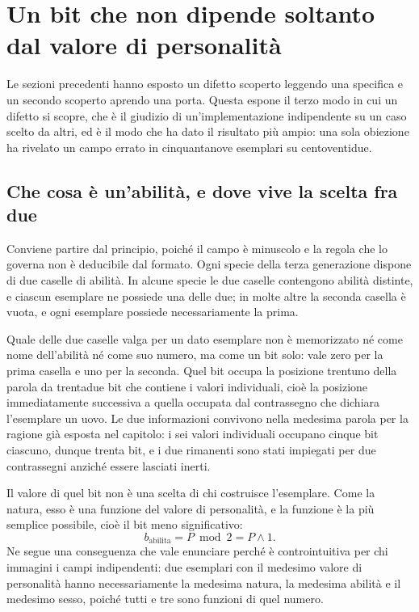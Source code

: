 \section{Un bit che non dipende soltanto dal valore di personalità}

Le sezioni precedenti hanno esposto un difetto scoperto leggendo una specifica e un secondo scoperto aprendo una porta. Questa espone il terzo modo in cui un difetto si scopre, che è il giudizio di un'implementazione indipendente su un caso scelto da altri, ed è il modo che ha dato il risultato più ampio: una sola obiezione ha rivelato un campo errato in cinquantanove esemplari su centoventidue.

\subsection*{Che cosa è un'abilità, e dove vive la scelta fra due}

Conviene partire dal principio, poiché il campo è minuscolo e la regola che lo governa non è deducibile dal formato. Ogni specie della terza generazione dispone di due caselle di abilità. In alcune specie le due caselle contengono abilità distinte, e ciascun esemplare ne possiede una delle due; in molte altre la seconda casella è vuota, e ogni esemplare possiede necessariamente la prima.

Quale delle due caselle valga per un dato esemplare non è memorizzato né come nome dell'abilità né come suo numero, ma come un bit solo: vale zero per la prima casella e uno per la seconda. Quel bit occupa la posizione trentuno della parola da trentadue bit che contiene i valori individuali, cioè la posizione immediatamente successiva a quella occupata dal contrassegno che dichiara l'esemplare un uovo. Le due informazioni convivono nella medesima parola per la ragione già esposta nel capitolo: i sei valori individuali occupano cinque bit ciascuno, dunque trenta bit, e i due rimanenti sono stati impiegati per due contrassegni anziché essere lasciati inerti.

Il valore di quel bit non è una scelta di chi costruisce l'esemplare. Come la natura, esso è una funzione del valore di personalità, e la funzione è la più semplice possibile, cioè il bit meno significativo:
\begin{equation}
b_{\mathrm{abilita}} = P \bmod 2 = P \wedge 1 .
\end{equation}
Ne segue una conseguenza che vale enunciare perché è controintuitiva per chi immagini i campi indipendenti: due esemplari con il medesimo valore di personalità hanno necessariamente la medesima natura, la medesima abilità e il medesimo sesso, poiché tutti e tre sono funzioni di quel numero.

